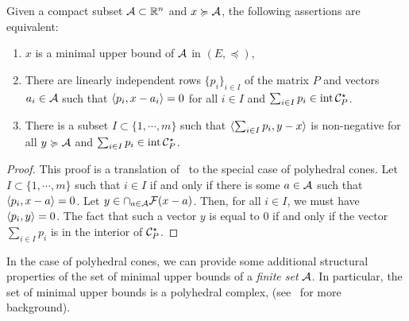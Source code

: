 \documentclass[main]{subfiles}
\begin{document}
\begin{corollary}
\label{cor:mub_poly}
Given a compact subset $\mathcal{A} \subset \mathbb{R}^n$ and $x \succcurlyeq \mathcal{A}$, the following assertions are equivalent:
\begin{enumerate}
\item $x$ is a minimal upper bound of $\mathcal{A}$ in $(E, \preceq)$,
\item \label{it:mub_pol_2}
There are  linearly independent rows $\{p_i\}_{i\in I}$ of the matrix $P$ and vectors $a_i \in \mathcal{A}$ such that
$\langle {p_i} , {x-a_i} \rangle = 0 $ for all $i \in I$ and $\sum_{i\in I} p_i \in \operatorname{int} \mathcal{C}_P^\star$.
\item There is a subset $I \subset \{1, \cdots,m\}$ such that $\langle {\sum_{i\in I} p_i} , {y - x} \rangle$ is non-negative for all $y \succcurlyeq \mathcal{A}$ and $\sum_{i\in I} p_i \in \operatorname{int} \mathcal{C}_P^\star$.
\end{enumerate}
\end{corollary}

\begin{proof}
This proof is a translation of~ to the special case of polyhedral cones.
Let $I \subset \{1,\cdots,m\}$ such that $i \in I$ if and only if there is some $a \in \mathcal{A}$ such that $\langle {p_i} , {x-a} \rangle = 0$.
Let $y \in \cap_{a \in \mathcal{A}} \mathcal{F}(x-a)$.
Then, for all $i\in I$, we must have $\langle {p_i} , {y} \rangle = 0$.
The fact that such a vector $y$ is equal to $0$ if and only if the vector $\sum_{i\in I}p_i$ is in the interior of $\mathcal{C}_P^\star$.
\end{proof}

In the case of polyhedral cones, we can provide some additional structural properties of the set of minimal upper bounds of a \emph{finite set} $\mathcal{A}$. In particular, the set of minimal upper bounds is a polyhedral complex, (see~\cite{DeLoera2010} for more background).
\end{document}
